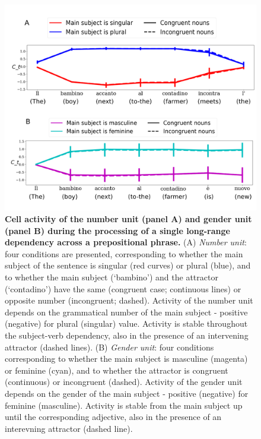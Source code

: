 \begin{figure}[t!]
    \centering
    \includegraphics[width=\textwidth]{figures/model_activations_nounpp.png}
    \caption{\textbf{Cell activity of the number unit (panel A) and gender unit (panel B) during the processing of a single long-range dependency across a prepositional phrase.} (A) \textit{Number unit}: four conditions are presented, corresponding to whether the main subject of the sentence is singular (red curves) or plural (blue), and to whether the main subject (`bambino') and the attractor (`contadino') have the same (congruent case; continuous lines) or opposite number (incongruent; dashed). Activity of the number unit depends on the grammatical number of the main subject - positive (negative) for plural (singular) value. Activity is stable throughout the subject-verb dependency, also in the presence of an intervening attractor (dashed lines). (B) \textit{Gender unit}: four conditions corresponding to whether the main subject is masculine (magenta) or feminine (cyan), and to whether the attractor is congruent (continuous) or incongruent (dashed). Activity of the gender unit depends on the gender of the main subject - positive (negative) for feminine (masculine). Activity is stable from the main subject up until the corresponding adjective, also in the presence of an interevning attractor (dashed line).}
    \label{fig:nounpp}
\end{figure} 


